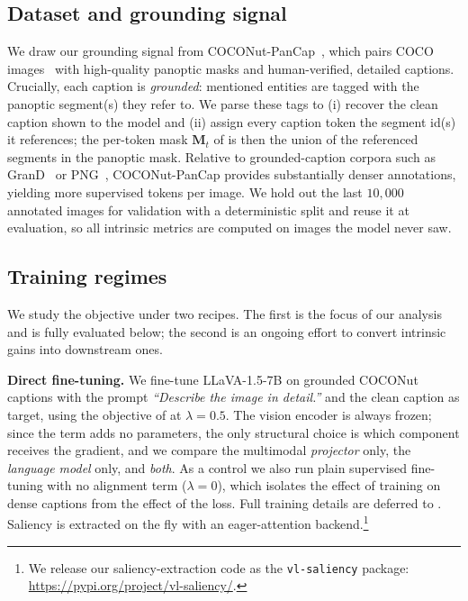 \subsection{Dataset and grounding signal}
We draw our grounding signal from COCONut-PanCap~\citep{deng2025coconut}, which pairs COCO images~\citep{lin2015microsoftcococommonobjects} with high-quality panoptic masks and human-verified, detailed captions. Crucially, each caption is \emph{grounded}: mentioned entities are tagged with the panoptic segment(s) they refer to. We parse these tags to (i) recover the clean caption shown to the model and (ii) assign every caption token the segment id(s) it references; the per-token mask $\mathbf{M}_t$ of  is then the union of the referenced segments in the panoptic mask. Relative to grounded-caption corpora such as GranD~\citep{rasheed2024glammpixelgroundinglarge} or PNG~\citep{gonzalez2021panopticnarrativegrounding}, COCONut-PanCap provides substantially denser annotations, yielding more supervised tokens per image. We hold out the last $10{,}000$ annotated images for validation with a deterministic split and reuse it at evaluation, so all intrinsic metrics are computed on images the model never saw.

\subsection{Training regimes}
\label{sec:regimes}
We study the objective under two recipes. The first is the focus of our analysis and is fully evaluated below; the second is an ongoing effort to convert intrinsic gains into downstream ones.

\textbf{Direct fine-tuning.} We fine-tune LLaVA-1.5-7B on grounded COCONut captions with the prompt \emph{``Describe the image in detail.''} and the clean caption as target, using the objective of  at $\lambda=0.5$. The vision encoder is always frozen; since the term adds no parameters, the only structural choice is which component receives the gradient, and we compare the multimodal \emph{projector} only, the \emph{language model} only, and \emph{both}. As a control we also run plain supervised fine-tuning with no alignment term ($\lambda=0$), which isolates the effect of training on dense captions from the effect of the loss. Full training details are deferred to . Saliency is extracted on the fly with an eager-attention backend.\footnote{We release our saliency-extraction code as the \texttt{vl-saliency} package: \url{https://pypi.org/project/vl-saliency/}.}

